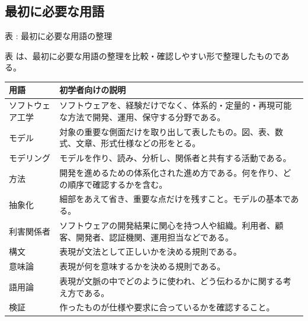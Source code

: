 \subsection*{最初に必要な用語}
\par\smallskip\noindent{}\label{tab:ch11-01}表 \thetable: 最初に必要な用語の整理\par\smallskip
表 \thetable は、最初に必要な用語の整理を比較・確認しやすい形で整理したものである。\par\smallskip
\begin{longtable}{>{\raggedright\arraybackslash}p{}>{\raggedright\arraybackslash}p{}}
\toprule
用語 & 初学者向けの説明 \\
\midrule
ソフトウェア工学 & ソフトウェアを、経験だけでなく、体系的・定量的・再現可能な方法で開発、運用、保守する分野である。\\
モデル & 対象の重要な側面だけを取り出して表したもの。図、表、数式、文章、形式仕様などの形をとる。\\
モデリング & モデルを作り、読み、分析し、関係者と共有する活動である。\\
方法 & 開発を進めるための体系化された進め方である。何を作り、どの順序で確認するかを含む。\\
抽象化 & 細部をあえて省き、重要な点だけを残すこと。モデルの基本である。\\
利害関係者 & ソフトウェアの開発結果に関心を持つ人や組織。利用者、顧客、開発者、認証機関、運用担当などである。\\
構文 & 表現が文法として正しいかを決める規則である。\\
意味論 & 表現が何を意味するかを決める規則である。\\
語用論 & 表現が文脈の中でどのように使われ、どう伝わるかに関する考え方である。\\
検証 & 作ったものが仕様や要求に合っているかを確認すること。\\
\bottomrule
\end{longtable}
